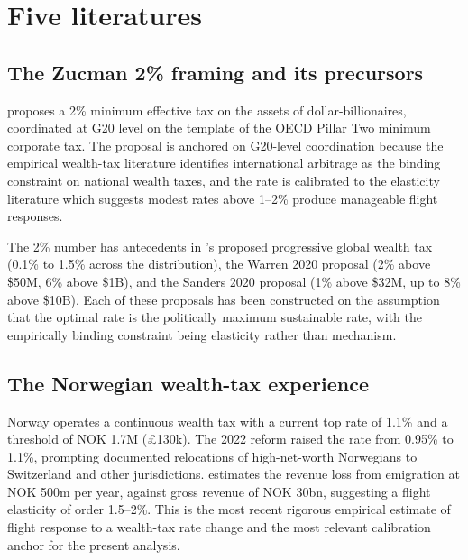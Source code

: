 \documentclass[11pt]{article}
\begin{document}
\section{Five literatures}
\label{sec:literature}

\subsection{The Zucman 2\% framing and its precursors}

\citet{zucman2024global} proposes a 2\% minimum effective tax on
the assets of dollar-billionaires, coordinated at G20 level on the
template of the OECD Pillar Two minimum corporate tax.  The
proposal is anchored on G20-level coordination because the
empirical wealth-tax literature
\citep{saez2019triumph, scheuer2020taxing} identifies international
arbitrage as the binding constraint on national wealth taxes, and
the rate is calibrated to the elasticity literature
\citep{young2016millionaire, moretti2017taxing} which suggests
modest rates above 1--2\% produce manageable flight responses.

The 2\% number has antecedents in \citet{piketty2014capital}'s
proposed progressive global wealth tax (0.1\% to 1.5\% across the
distribution), the Warren 2020 proposal (2\% above \$50M, 6\%
above \$1B), and the Sanders 2020 proposal (1\% above \$32M,
up to 8\% above \$10B).  Each of these proposals has been
constructed on the assumption that the optimal rate is the
politically maximum sustainable rate, with the empirically
binding constraint being elasticity rather than mechanism.

\subsection{The Norwegian wealth-tax experience}

Norway operates a continuous wealth tax with a current top rate of
1.1\% and a threshold of NOK 1.7M (\pounds 130k).  The 2022 reform
raised the rate from 0.95\% to 1.1\%, prompting documented
relocations of high-net-worth Norwegians to Switzerland and other
jurisdictions.  \citet{ringstad2024norwegian} estimates the
revenue loss from emigration at NOK 500m per year, against gross
revenue of NOK 30bn, suggesting a flight elasticity of order
1.5--2\%.  This is the most recent rigorous empirical estimate of
flight response to a wealth-tax rate change and the most relevant
calibration anchor for the present analysis.
\end{document}
